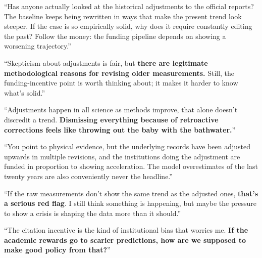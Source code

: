 \begin{casebox}



\textcolor{malRed}{``Has anyone actually looked at the historical adjustments to the official reports? The baseline keeps being rewritten in ways that make the present trend look steeper. If the case is so empirically solid, why does it require constantly editing the past? Follow the money: the funding pipeline depends on showing a worsening trajectory.''}

``Skepticism about adjustments is fair, but \textbf{there are legitimate methodological reasons for revising older measurements.} Still, the funding-incentive point is worth thinking about; it makes it harder to know what's solid.''

``Adjustments happen in all science as methods improve, that alone doesn't discredit a trend. \textbf{Dismissing everything because of retroactive corrections feels like throwing out the baby with the bathwater.}''


\textcolor{malRed}{``You point to physical evidence, but the underlying records have been adjusted upwards in multiple revisions, and the institutions doing the adjustment are funded in proportion to showing acceleration. The model overestimates of the last twenty years are also conveniently never the headline.''}

``If the raw measurements don't show the same trend as the adjusted ones, \textbf{that's a serious red flag}. I still think something is happening, but maybe the pressure to show a crisis is shaping the data more than it should.''

``The citation incentive is the kind of institutional bias that worries me. \textbf{If the academic rewards go to scarier predictions, how are we supposed to make good policy from that?}''


\end{casebox}
